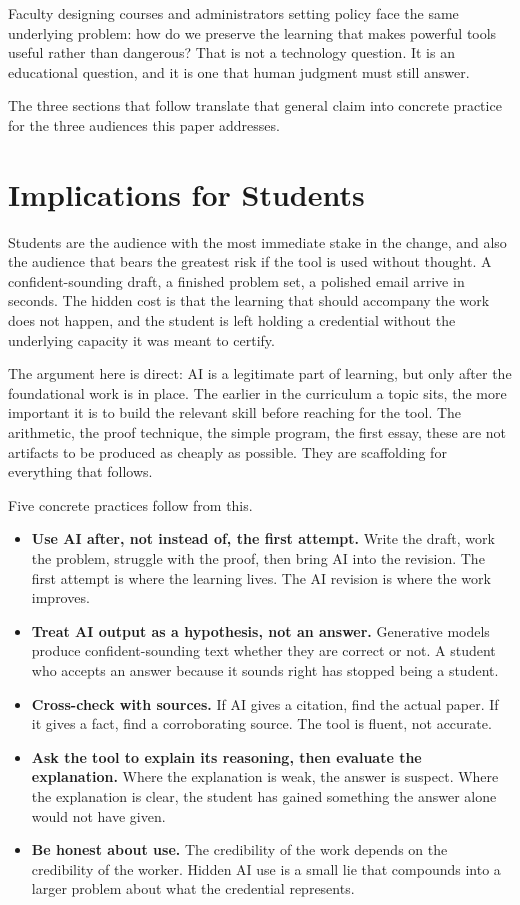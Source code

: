 \documentclass[12pt]{article}
\begin{document}
Faculty designing courses and administrators setting policy face the same underlying problem: how do we preserve the learning that makes powerful tools useful rather than dangerous? That is not a technology question. It is an educational question, and it is one that human judgment must still answer.

The three sections that follow translate that general claim into concrete practice for the three audiences this paper addresses.

\section{Implications for Students}

Students are the audience with the most immediate stake in the change, and also the audience that bears the greatest risk if the tool is used without thought. A confident-sounding draft, a finished problem set, a polished email arrive in seconds. The hidden cost is that the learning that should accompany the work does not happen, and the student is left holding a credential without the underlying capacity it was meant to certify.

The argument here is direct: AI is a legitimate part of learning, but only after the foundational work is in place. The earlier in the curriculum a topic sits, the more important it is to build the relevant skill before reaching for the tool. The arithmetic, the proof technique, the simple program, the first essay, these are not artifacts to be produced as cheaply as possible. They are scaffolding for everything that follows.

Five concrete practices follow from this.

\begin{itemize}[leftmargin=*, itemsep=0.3em]
    \item \textbf{Use AI after, not instead of, the first attempt.} Write the draft, work the problem, struggle with the proof, then bring AI into the revision. The first attempt is where the learning lives. The AI revision is where the work improves.
    \item \textbf{Treat AI output as a hypothesis, not an answer.} Generative models produce confident-sounding text whether they are correct or not. A student who accepts an answer because it sounds right has stopped being a student.
    \item \textbf{Cross-check with sources.} If AI gives a citation, find the actual paper. If it gives a fact, find a corroborating source. The tool is fluent, not accurate.
    \item \textbf{Ask the tool to explain its reasoning, then evaluate the explanation.} Where the explanation is weak, the answer is suspect. Where the explanation is clear, the student has gained something the answer alone would not have given.
    \item \textbf{Be honest about use.} The credibility of the work depends on the credibility of the worker. Hidden AI use is a small lie that compounds into a larger problem about what the credential represents.
\end{itemize}
\end{document}
